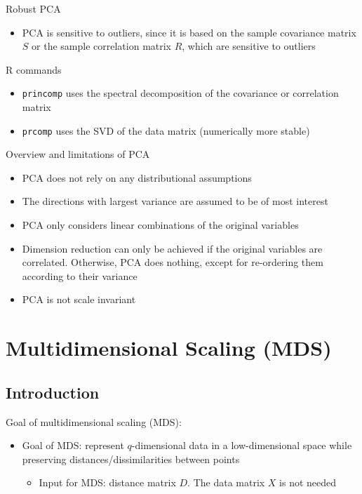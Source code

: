 \documentclass[a4paper]{article}
\begin{document}
Robust PCA
\begin{itemize}
    \item PCA is sensitive to outliers, since it is based on the sample covariance matrix $S$ or the sample correlation matrix $R$, which are sensitive to outliers
\end{itemize}

R commands
\begin{itemize}
    \item \texttt{princomp} uses the spectral decomposition of the covariance or correlation matrix
    \item \texttt{prcomp} uses the SVD of the data matrix (numerically more stable)
\end{itemize}

Overview and limitations of PCA
\begin{itemize}
    \item PCA does not rely on any distributional assumptions
    \item The directions with largest variance are assumed to be of most interest
    \item PCA only considers linear combinations of the original variables
    \item Dimension reduction can only be achieved if the original variables are correlated. Otherwise, PCA does nothing, except for re-ordering them according to their variance
    \item PCA is not scale invariant
\end{itemize}

\section{Multidimensional Scaling (MDS)}

\subsection{Introduction}

Goal of multidimensional scaling (MDS):
\begin{itemize}
    \item Goal of MDS: represent $q$-dimensional data in a low-dimensional space while preserving distances/dissimilarities between points
    \begin{itemize}
        \item Input for MDS: distance matrix $D$. The data matrix $X$ is not needed
    \end{itemize}
\end{itemize}
\end{document}
